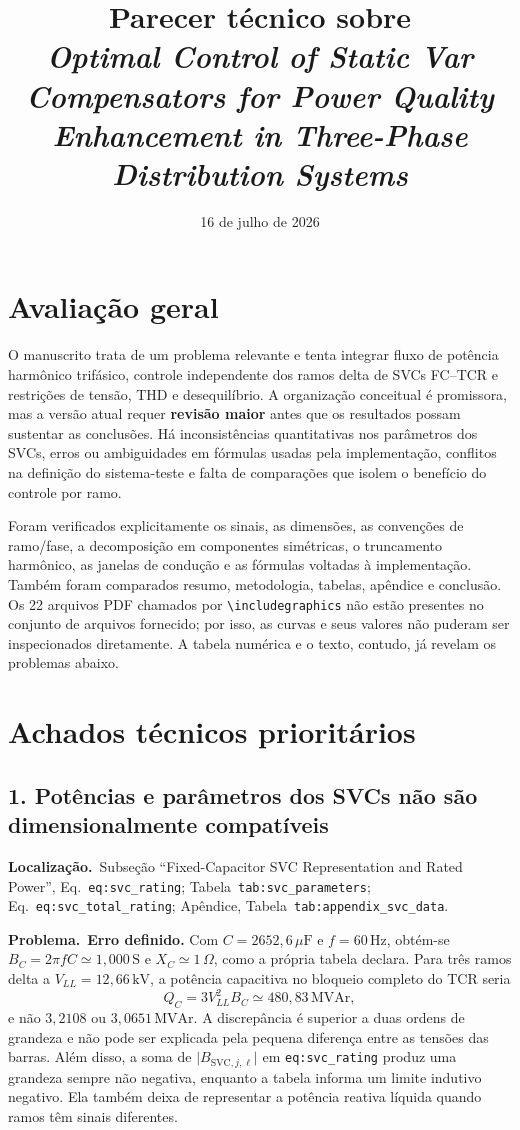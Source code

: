 \documentclass[11pt,a4paper]{article}
\title{Parecer técnico sobre\\
\emph{Optimal Control of Static Var Compensators for Power Quality Enhancement in Three-Phase Distribution Systems}}
\author{}
\date{16 de julho de 2026}
\newcommand{\localizacao}{\textbf{Localização.}\ }
\newcommand{\problema}{\textbf{Problema.}\ }
\begin{document}
\maketitle

\section*{Avaliação geral}

O manuscrito trata de um problema relevante e tenta integrar fluxo de potência
harmônico trifásico, controle independente dos ramos delta de SVCs FC--TCR e
restrições de tensão, THD e desequilíbrio. A organização conceitual é
promissora, mas a versão atual requer \textbf{revisão maior} antes que os
resultados possam sustentar as conclusões. Há inconsistências quantitativas nos
parâmetros dos SVCs, erros ou ambiguidades em fórmulas usadas pela implementação,
conflitos na definição do sistema-teste e falta de comparações que isolem o
benefício do controle por ramo.

Foram verificados explicitamente os sinais, as dimensões, as convenções de
ramo/fase, a decomposição em componentes simétricas, o truncamento harmônico,
as janelas de condução e as fórmulas voltadas à implementação. Também foram
comparados resumo, metodologia, tabelas, apêndice e conclusão. Os 22 arquivos
PDF chamados por \verb|\includegraphics| não estão presentes no conjunto de
arquivos fornecido; por isso, as curvas e seus valores não puderam ser
inspecionados diretamente. A tabela numérica e o texto, contudo, já revelam os
problemas abaixo.

\section*{Achados técnicos prioritários}

\subsection*{1. Potências e parâmetros dos SVCs não são dimensionalmente compatíveis}

\localizacao Subseção ``Fixed-Capacitor SVC Representation and Rated Power'',
Eq.~\texttt{eq:svc\_rating}; Tabela~\texttt{tab:svc\_parameters};
Eq.~\texttt{eq:svc\_total\_rating}; Apêndice,
Tabela~\texttt{tab:appendix\_svc\_data}.

\problema \textbf{Erro definido.} Com $C=2652{,}6\,\mu\mathrm{F}$ e
$f=60\,\mathrm{Hz}$, obtém-se
$B_C=2\pi fC\simeq1{,}000\,\mathrm{S}$ e $X_C\simeq1\,\Omega$, como a
própria tabela declara. Para três ramos delta a $V_{LL}=12{,}66\,\mathrm{kV}$,
a potência capacitiva no bloqueio completo do TCR seria
\[
  Q_C=3V_{LL}^2B_C\simeq480{,}83\,\mathrm{MVAr},
\]
e não $3{,}2108$ ou $3{,}0651\,\mathrm{MVAr}$. A discrepância é superior a
duas ordens de grandeza e não pode ser explicada pela pequena diferença entre
as tensões das barras. Além disso, a soma de
$\lvert B_{\mathrm{SVC},j,\ell}\rvert$ em
\texttt{eq:svc\_rating} produz uma grandeza sempre não negativa, enquanto a
tabela informa um limite indutivo negativo. Ela também deixa de representar a
potência reativa líquida quando ramos têm sinais diferentes.
\end{document}
